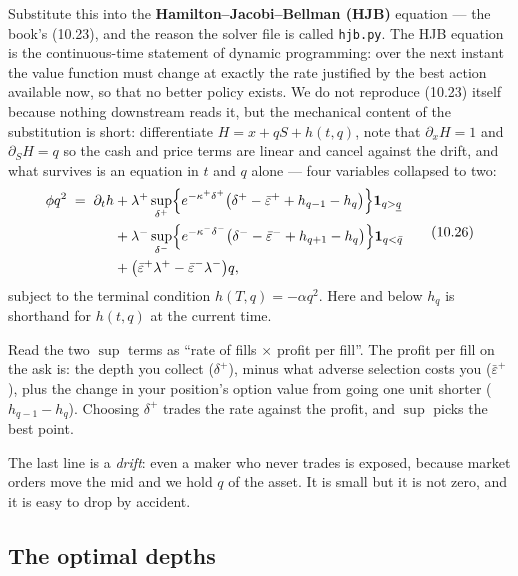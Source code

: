 \documentclass[11pt,a4paper]{article}
\newcommand{\dplus}{\delta^{+}}
\newcommand{\dminus}{\delta^{-}}
\newcommand{\epsb}{\bar{\varepsilon}}
\newcommand{\code}[1]{\texttt{\small #1}}
\begin{document}
Substitute this into the \textbf{Hamilton--Jacobi--Bellman (HJB)} equation ---
the book's (10.23), and the reason the solver file is called \code{hjb.py}. The
HJB equation is the continuous-time statement of dynamic programming: over the
next instant the value function must change at exactly the rate justified by the
best action available now, so that no better policy exists. We do not reproduce
(10.23) itself because nothing downstream reads it, but the mechanical content of
the substitution is short: differentiate $H = x + qS + h(t,q)$, note that
$\partial_x H = 1$ and $\partial_S H = q$ so the cash and price terms are linear
and cancel against the drift, and what survives is an equation in $t$ and $q$
alone --- four variables collapsed to two:
\begin{equation}
\begin{aligned}
  \phi q^{2} \;=\; \partial_t h
  &+ \lambda^{+}\sup_{\dplus}\Bigl\{ e^{-\kappa^{+}\dplus}
      \bigl(\dplus - \epsb^{+} + h_{q-1} - h_q\bigr)\Bigr\}\mathbf{1}_{q>\underline{q}}\\
  &+ \lambda^{-}\sup_{\dminus}\Bigl\{ e^{-\kappa^{-}\dminus}
      \bigl(\dminus - \epsb^{-} + h_{q+1} - h_q\bigr)\Bigr\}\mathbf{1}_{q<\bar{q}}\\
  &+ \bigl(\epsb^{+}\lambda^{+} - \epsb^{-}\lambda^{-}\bigr) q,
\end{aligned}
  \tag{10.26}
  \label{eq:1026}
\end{equation}
subject to the terminal condition $h(T,q) = -\alpha q^{2}$. Here and below
$h_q$ is shorthand for $h(t,q)$ at the current time.

\begin{intuition}
Read the two $\sup$ terms as ``rate of fills $\times$ profit per fill''. The
profit per fill on the ask is: the depth you collect ($\dplus$), minus what
adverse selection costs you ($\epsb^{+}$), plus the change in your position's
option value from going one unit shorter ($h_{q-1}-h_q$). Choosing $\dplus$
trades the rate against the profit, and $\sup$ picks the best point.

The last line is a \emph{drift}: even a maker who never trades is exposed,
because market orders move the mid and we hold $q$ of the asset. It is small but
it is not zero, and it is easy to drop by accident.
\end{intuition}

\subsection{The optimal depths}
\end{document}
